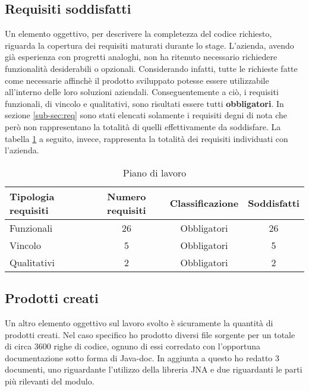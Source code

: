 \subsection{Requisiti soddisfatti}
Un elemento oggettivo, per descrivere la completezza del codice richiesto, riguarda la copertura dei requisiti maturati durante lo stage.
L’azienda, avendo già esperienza con progretti analoghi, non ha ritenuto necessario richiedere funzionalità 
desiderabili o opzionali. Considerando infatti, tutte le richieste fatte come necessarie affinchè il prodotto sviluppato potesse essere utilizzabile
all'interno delle loro soluzioni aziendali.
Conseguentemente a ciò, i requisiti funzionali, di vincolo e qualitativi, sono risultati essere tutti \textbf{obbligatori}.
In sezione \ref{sub-sec:req} sono stati elencati solamente i requisiti degni di nota che però non rappresentano la totalità di quelli 
effettivamente da soddisfare.
La tabella \ref{tab:req-solved} a seguito, invece, rappresenta la totalità dei requisiti individuati con l’azienda.
\begin{table}[h!]
    \begin{tabularx}{\textwidth}{ | X | c | c | c | }
    \hline
    \textbf{Tipologia requisiti} & \textbf{Numero requisiti} & \textbf{Classificazione} & \textbf{Soddisfatti}\\
    \hline
    Funzionali & 26 & Obbligatori & 26 \\
    \hline
    Vincolo & 5 & Obbligatori & 5 \\
    \hline
    Qualitativi & 2 & Obbligatori & 2 \\
    \hline
    \end{tabularx}
    \caption{Piano di lavoro}
    \label{tab:req-solved}
\end{table}

\subsection{Prodotti creati}
Un altro elemento oggettivo sul lavoro svolto è sicuramente la quantità di prodotti creati. 
Nel caso specifico ho prodotto diversi file sorgente per un totale di circa 3600 righe di codice, ognuno di essi corredato
con l'opportuna documentazione sotto forma di Java-doc. In aggiunta a questo ho redatto 3 documenti, uno riguardante l'utilizzo
della libreria JNA e due riguardanti le parti più rilevanti del modulo.